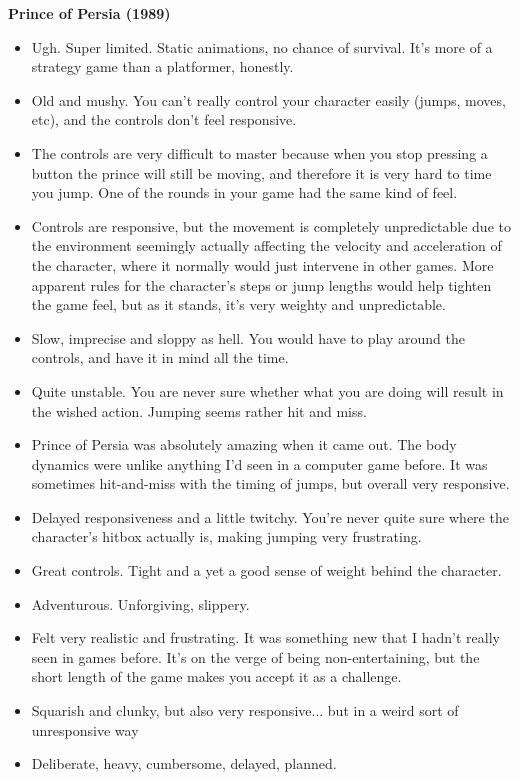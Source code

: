 \textbf{Prince of Persia (1989)}
\vspace{-5mm}
\begin{itemize}[noitemsep,nolistsep]
\item Ugh. Super limited. Static animations, no chance of survival. It's more of a strategy game than a platformer, honestly.
\item Old and mushy. You can't really control your character easily (jumps, moves, etc), and the controls don't feel responsive.
\item The controls are very difficult to master because when you stop pressing a button the prince will still be moving, and therefore it is very hard to time you jump. One of the rounds in your game had the same kind of feel.
\item Controls are responsive, but the movement is completely unpredictable due to the environment seemingly actually affecting the velocity and acceleration of the character, where it normally would just intervene in other games. More apparent rules for the character's steps or jump lengths would help tighten the game feel, but as it stands, it's very weighty and unpredictable.
\item Slow, imprecise and sloppy as hell. You would have to play around the controls, and have it in mind all the time.
\item Quite unstable. You are never sure whether what you are doing will result in the wished action. Jumping seems rather hit and miss.
\item Prince of Persia was absolutely amazing when it came out. The body dynamics were unlike anything I'd seen in a computer game before. It was sometimes hit-and-miss with the timing of jumps, but overall very responsive.
\item Delayed responsiveness and a little twitchy. You're never quite sure where the character's hitbox actually is, making jumping very frustrating.
\item Great controls. Tight and a yet a good sense of weight behind the character.
\item Adventurous. Unforgiving, slippery.
\item Felt very realistic and frustrating. It was something new that I hadn't really seen in games before. It's on the verge of being non-entertaining, but the short length of the game makes you accept it as a challenge.
\item Squarish and clunky, but also very responsive... but in a weird sort of unresponsive way
\item Deliberate, heavy, cumbersome, delayed, planned. 
\end{itemize}


